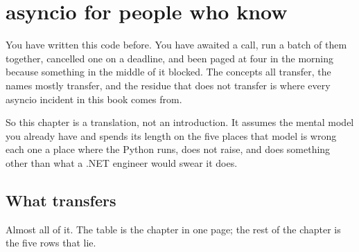 
\chapter{asyncio for people who know \texorpdfstring{}{Task}}
\label{ch:asyncio}

\noindent
You have written this code before. You have awaited a call, run a batch of
them together, cancelled one on a deadline, and been paged at four in the
morning because something in the middle of it blocked. The concepts all
transfer, the names mostly transfer, and the residue that does not transfer
is where every asyncio incident in this book comes from.

So this chapter is a translation, not an introduction. It assumes the
mental model you already have and spends its length on the five places
that model is wrong \dash{} each one a place where the Python runs, does
not raise, and does something other than what a .NET engineer would swear
it does.

\section{What transfers}
\label{sec:asyncio-map}

Almost all of it. The table is the chapter in one page; the rest of the
chapter is the five rows that lie.

